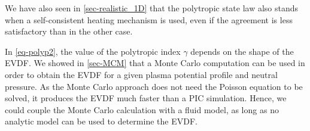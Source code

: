 We have also seen in \cref{sec-realistic_1D} that the polytropic state law also stands when a self-consistent heating mechanism is used, even if the agreement is less satisfactory than in the other case.

In \cref{eq-polyp2}, the value of the polytropic index $\gamma$ depends on the shape of the \ac{EVDF}.
We showed in \cref{sec-MCM} that a Monte Carlo computation can be used in order to obtain the \ac{EVDF} for a given plasma potential profile and neutral pressure.
As the Monte Carlo approach does not need the Poisson equation to be solved, it produces the \ac{EVDF} much faster than a \ac{PIC} simulation.
Hence, we could couple the Monte Carlo calculation with a fluid model, as long as no analytic model can be used to determine the \ac{EVDF}.

